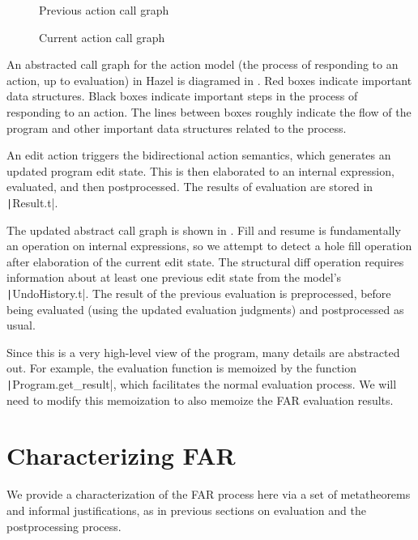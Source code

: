 \begin{figure}
  \centering
  
  \caption{Previous action call graph}
  \label{fig:prev-evaluation-call-graph}
\end{figure}

\begin{figure}
  \centering
  
  \caption{Current action call graph}
  \label{fig:current-evaluation-call-graph}
\end{figure}

An abstracted call graph for the action model (the process of responding to an action, up to evaluation) in Hazel is diagramed in . Red boxes indicate important data structures. Black boxes indicate important steps in the process of responding to an action. The lines between boxes roughly indicate the flow of the program and other important data structures related to the process.

An edit action triggers the bidirectional action semantics, which generates an updated program edit state. This is then elaborated to an internal expression, evaluated, and then postprocessed. The results of evaluation are stored in \texttt|Result.t|.

The updated abstract call graph is shown in . Fill and resume is fundamentally an operation on internal expressions, so we attempt to detect a hole fill operation after elaboration of the current edit state. The structural diff operation requires information about at least one previous edit state from the model's \texttt|UndoHistory.t|. The result of the previous evaluation is preprocessed, before being evaluated (using the updated evaluation judgments) and postprocessed as usual.

Since this is a very high-level view of the program, many details are abstracted out. For example, the evaluation function is memoized by the function \texttt|Program.get_result|, which facilitates the normal evaluation process. We will need to modify this memoization to also memoize the FAR evaluation results.

\section{Characterizing FAR}
\label{sec:far-metatheorems}

We provide a characterization of the FAR process here via a set of metatheorems and informal justifications, as in previous sections on evaluation and the postprocessing process.

